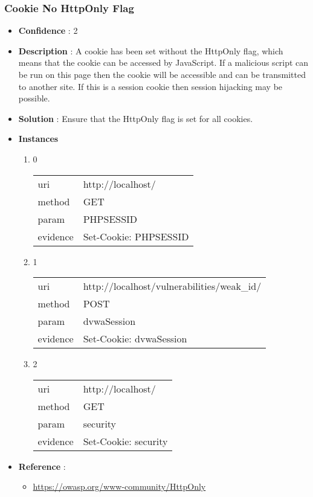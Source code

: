 \documentclass[10pt]{article}
\begin{document}
\subsubsection{Cookie No HttpOnly Flag}
\begin{itemize}
\item[] \textbf{Confidence} : 2
\item[] \textbf{Description} : A cookie has been set without the HttpOnly flag, which means that the cookie can be accessed by JavaScript. If a malicious script can be run on this page then the cookie will be accessible and can be transmitted to another site. If this is a session cookie then session hijacking may be possible.
\item[] \textbf{Solution} :  Ensure that the HttpOnly flag is set for all cookies.
\item[] \textbf{Instances}
\begin{enumerate}
\item[] 0
\begin{tabular}{| l | p{12cm}}
uri & http://localhost/ \\
method & GET \\
param & PHPSESSID \\
evidence & Set-Cookie: PHPSESSID \\
\end{tabular}
\item[] 1
\begin{tabular}{| l | p{12cm}}
uri & http://localhost/vulnerabilities/weak\_id/ \\
method & POST \\
param & dvwaSession \\
evidence & Set-Cookie: dvwaSession \\
\end{tabular}
\item[] 2
\begin{tabular}{| l | p{12cm}}
uri & http://localhost/ \\
method & GET \\
param & security \\
evidence & Set-Cookie: security \\
\end{tabular}
\end{enumerate}
\item[] \textbf{Reference} : 
\begin{itemize}
\item \url{https://owasp.org/www-community/HttpOnly}
\end{itemize}
\end{itemize}
\end{document}
